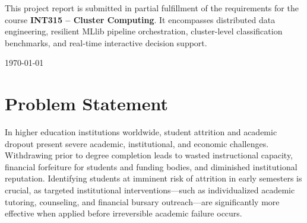 \documentclass[11pt,a4paper]{article}
\begin{document}
\begin{titlepage}
    \vfill
    
    \begin{tcolorbox}[colback=blue!5!white,colframe=blue!75!black,title=\centering \bfseries Academic Declaration]
        \small This project report is submitted in partial fulfillment of the requirements for the course \textbf{INT315 -- Cluster Computing}. It encompasses distributed data engineering, resilient MLlib pipeline orchestration, cluster-level classification benchmarks, and real-time interactive decision support.
    \end{tcolorbox}
    
    \vspace{0.5cm}
    {\large \today \par}
\end{titlepage}

\tableofcontents
\newpage

\section{Problem Statement}
\label{sec:problem_statement}

In higher education institutions worldwide, student attrition and academic dropout present severe academic, institutional, and economic challenges. Withdrawing prior to degree completion leads to wasted instructional capacity, financial forfeiture for students and funding bodies, and diminished institutional reputation. Identifying students at imminent risk of attrition in early semesters is crucial, as targeted institutional interventions---such as individualized academic tutoring, counseling, and financial bursary outreach---are significantly more effective when applied before irreversible academic failure occurs.
\end{document}
